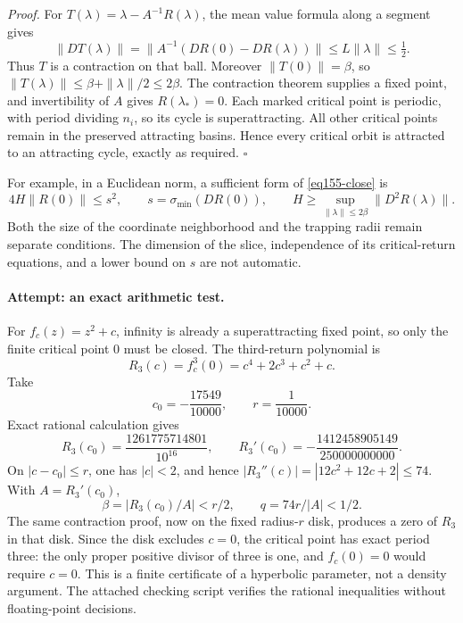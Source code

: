 \documentclass[11pt,a4paper]{article}
\numberwithin{equation}{section}
\begin{document}
\textit{Proof.} For $T(\lambda)=\lambda-A^{-1}R(\lambda)$, the mean value
formula along a segment gives
\[
 \|DT(\lambda)\|
 =\|A^{-1}(DR(0)-DR(\lambda))\|
 \le L\|\lambda\|\le\tfrac12.
\]
Thus $T$ is a contraction on that ball. Moreover
$\|T(0)\|=\beta$, so
$\|T(\lambda)\|\le\beta+\|\lambda\|/2\le2\beta$.
The contraction theorem supplies a fixed point, and invertibility of $A$
gives $R(\lambda_*)=0$. Each marked critical point is periodic, with period
dividing $n_i$, so its cycle is superattracting. All other critical points
remain in the preserved attracting basins. Hence every critical orbit is
attracted to an attracting cycle, exactly as required. \hfill$\square$

For example, in a Euclidean norm, a sufficient form of
\eqref{eq155-close} is
\[
 4H\|R(0)\|\le s^2,
 \qquad s=\sigma_{\min}(DR(0)),\qquad
 H\ge\sup_{\|\lambda\|\le2\beta}\|D^2R(\lambda)\|.
\]
Both the size of the coordinate neighborhood and the trapping radii remain
separate conditions. The dimension of the slice, independence of its
critical-return equations, and a lower bound on $s$ are not automatic.

\paragraph{Attempt: an exact arithmetic test.}
For $f_c(z)=z^2+c$, infinity is already a superattracting fixed point, so
only the finite critical point $0$ must be closed. The third-return
polynomial is
\[
 R_3(c)=f_c^3(0)=c^4+2c^3+c^2+c.
\]
Take
\[
 c_0=-\frac{17549}{10000},\qquad r=\frac1{10000}.
\]
Exact rational calculation gives
\[
 R_3(c_0)=\frac{1261775714801}{10^{16}},\qquad
 R_3'(c_0)=-\frac{1412458905149}{250000000000}.
\]
On $|c-c_0|\le r$, one has $|c|<2$, and hence
$|R_3''(c)|=|12c^2+12c+2|\le74$. With $A=R_3'(c_0)$,
\[
 \beta=|R_3(c_0)/A|<r/2,\qquad q=74r/|A|<1/2.
\]
The same contraction proof, now on the fixed radius-$r$ disk, produces a
zero of $R_3$ in that disk. Since the disk excludes $c=0$, the critical
point has exact period three: the only proper positive divisor of three is
one, and $f_c(0)=0$ would require $c=0$. This is a finite certificate of a
hyperbolic parameter, not a density argument. The attached checking script
verifies the rational inequalities without floating-point decisions.
\end{document}
